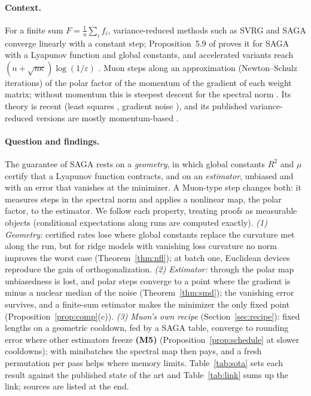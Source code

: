 \documentclass[10pt]{article}
\theoremstyle{remark}
\newcommand{\finding}[1]{\textbf{(#1)}}
\begin{document}
\paragraph{Context.} For a finite sum $F=\frac1n\sum_if_i$, variance-reduced methods such as SVRG
\cite{johnson2013accelerating} and SAGA \cite{defazio2014saga} converge linearly with a constant step; Proposition~5.9 of
\cite{bach2024learning} proves it for SAGA with a Lyapunov function and global constants, and accelerated variants reach
$(n+\sqrt{n\kappa})\log(1/\varepsilon)$ \cite{allenzhu2018katyusha,kovalev2020dont,lan2018optimal}. Muon
\cite{jordan2024muon} steps along an approximation (Newton--Schulz iterations) of the polar factor of the momentum of the
gradient of each weight matrix; without momentum this is steepest descent for the spectral norm
\cite{carlson2015stochastic,bernstein2024old}. Its theory is recent (least squares
\cite{shulgin2026quadratic,vasudeva2025muon}, gradient noise \cite{xie2026muon,chen2026when,paquette2026phases}), and its
published variance-reduced versions are mostly momentum-based \cite{liu2025marsm}.

\paragraph{Question and findings.} The guarantee of SAGA rests on a \emph{geometry}, in which global constants $R^2$ and
$\mu$ certify that a Lyapunov function contracts, and on an \emph{estimator}, unbiased and with an error that vanishes at
the minimizer. A Muon-type step changes both: it measures steps in the spectral norm and applies a nonlinear map, the
polar factor, to the estimator. We follow each property, treating proofs as measurable objects (conditional
expectations along runs are computed exactly). \emph{(1) Geometry:} certified rates lose where global constants replace
the curvature met along the run, but for ridge models with vanishing loss curvature no norm improves the worst case
(Theorem~\ref{thm:nfl}); at batch one, Euclidean devices reproduce the gain of orthogonalization. \emph{(2) Estimator:}
through the polar map unbiasedness is lost, and polar steps converge to a point where the gradient is minus a nuclear
median of the noise (Theorem~\ref{thm:smd}); the vanishing error survives, and a finite-sum estimator makes the
minimizer the only fixed point (Proposition~\ref{prop:comp}(c)). \emph{(3) Muon's own recipe}
(Section~\ref{sec:recipe}): fixed lengths on a geometric cooldown, fed by a SAGA table, converge to rounding error where
other estimators freeze \finding{M5} (Proposition~\ref{prop:schedule} at slower cooldowns); with minibatches the spectral map then pays, and a fresh
permutation per pass helps where memory limits. Table~\ref{tab:sota} sets each result against the published state of
the art and Table~\ref{tab:link} sums up the link; sources are listed at the end.
\end{document}
